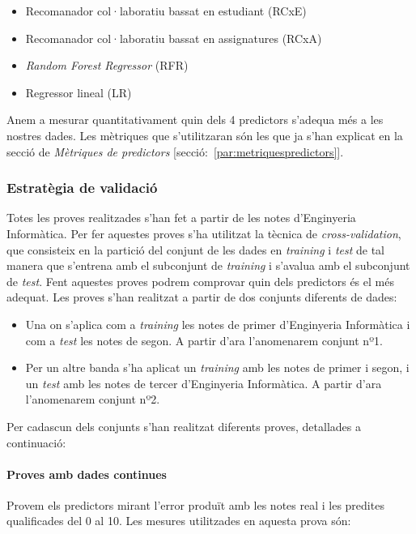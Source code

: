 \documentclass[12pt,a4paper,catalan]{article}
\begin{document}
\begin{itemize}[leftmargin=.5in]
	\item Recomanador col·laboratiu bassat en estudiant (RCxE)
	\item Recomanador col·laboratiu bassat en assignatures (RCxA)
	\item \textit{Random Forest Regressor} (RFR)
	\item Regressor lineal (LR)
\end{itemize}

Anem a mesurar quantitativament quin dels 4 predictors s'adequa més a les nostres dades. Les mètriques que s'utilitzaran són les que ja s'han explicat en la secció de \textit{Mètriques de predictors} [secció:~\ref{par:metriquespredictors}].

\subsubsection{Estratègia de validació}
Totes les proves realitzades s'han fet a partir de les notes d'Enginyeria Informàtica. Per fer aquestes proves s'ha utilitzat la tècnica de \textit{cross-validation}, que  consisteix en la partició del conjunt de les dades en \textit{training} i \textit{test} de tal manera que s'entrena amb el subconjunt de \textit{training} i s'avalua amb el subconjunt de \textit{test}. Fent aquestes proves podrem comprovar quin dels predictors és el més adequat. Les proves s'han realitzat a partir de dos conjunts diferents de dades:

\begin{itemize}[leftmargin=.5in]
	\item Una on s'aplica com a \textit{training} les notes de primer d'Enginyeria Informàtica i com a \textit{test} les notes de segon. A partir d'ara l'anomenarem conjunt nº1.
	\item Per un altre banda s'ha aplicat un \textit{training} amb les notes de primer i segon, i un \textit{test} amb les notes de tercer d'Enginyeria Informàtica. A partir d'ara l'anomenarem conjunt nº2.
\end{itemize}

Per cadascun dels conjunts s'han realitzat diferents proves, detallades a continuació:

\paragraph{Proves amb dades continues}
Provem els predictors mirant l'error produït amb les notes real i les predites qualificades del 0 al 10. Les mesures utilitzades en aquesta prova són:
\end{document}
